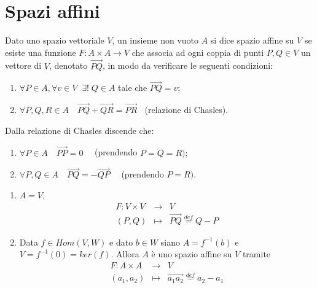 \documentclass[a4paper,12pt]{article}
\newcommand{\Got}[1]{#1}
\newcommand{\got}[1]{{#1}}
\newcommand{\vet}[1]{\overrightarrow{#1}}
\begin{document}
	\section{Spazi affini}
 
 \Got{Dato uno spazio vettoriale} $\got{V}$, \Got{un insieme non vuoto} $\got{A}$ \Got{si dice spazio affine su} $\got{V}$
 \Got{se esiste una funzione} $\got{F:A\times A\to V}$ \Got{che associa ad ogni coppia di punti} $\got{P,Q\in V}$ \Got{un vettore di} $\got{V}$,
 \Got{denotato} $\overrightarrow{\got{PQ}}$, \Got{in modo da verificare le seguenti condizioni:}
 \begin{enumerate}[label=\bf\Roman*)]
	\item $\got{\forall P\in A,\forall v\in V\;\;\exists!\; Q\in A}$ \Got{tale che} $\overrightarrow{\got{PQ}}=\got{v}$;
	\item $\got{\forall P,Q,R\in A}\quad\overrightarrow{\got{PQ}}+\overrightarrow{\got{QR}}=\overrightarrow{\got{PR}}\;\;$
		\Got{(relazione di Chasles)}.
 \end{enumerate}
 
 \begin{remark}
 \Got{Dalla relazione di Chasles discende che:} 
 \begin{enumerate}[label=\bf\alph*)]
	\item $\got{\forall P\in A}\quad\overrightarrow{\got{PP}}=\got{0}\quad$ \Got{(prendendo} $\got{P=Q=R);}$
	\item $\got{\forall P,Q\in A}\quad\overrightarrow{\got{PQ}}=-\overrightarrow{\got{QP}}\quad$ \Got{(prendendo} $\got{P=R).}$
 \end{enumerate}
 \end{remark}
 
 \begin{esempi}
	\begin{enumerate}[label=\bf\Roman*)]
 \item $\got{A=V}$,
 \begin{eqnarray*}
	\got{F:} \got{V}\times \got{V} & \to & \got{V} \\
	\got{(P,Q)} & \mapsto & \vet{PQ}\stackrel{\got{def}}{=}\got{Q-P}
 \end{eqnarray*}
 \item Data $\got{f\in Hom(V,W)}$ \Got{e dato} $\got{b\in W}$ \Got{siano} $\got{A=f^{-1}(b)}$ \Got{e} $\got{V=f^{-1}(0)=ker(f)}$.
 \Got{Allora} $\got{A}$ \Got{è uno spazio affine su} $\got{V}$ \Got{tramite}
 \begin{eqnarray*}
  \got{F:} \got{A\times A} & \to & \got{V} \\
  \got{(a_1,a_2)} & \mapsto & \vet{a_1a_2}\stackrel{\got{def}}{=}\got{a_2-a_1}
 \end{eqnarray*}
 \end{enumerate}
 \end{esempi}
 
\end{document}
